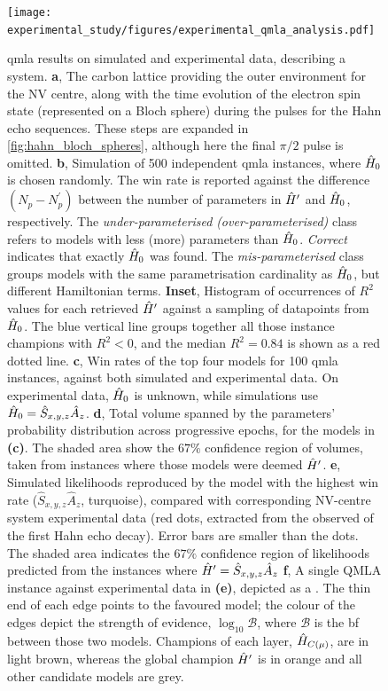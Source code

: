 \begin{figure}
    \texttt{[image: experimental\_study/figures/experimental\_qmla\_analysis.pdf]}
    \caption[\gls{qmla} applied to experimental  system]{
        \gls{qmla} results on simulated and experimental data, describing a  system. 
        \textbf{a}, 
        The carbon lattice providing the outer environment for the NV centre, along with the
        time evolution of the electron spin state (represented on a Bloch sphere) during the pulses for the Hahn echo sequences. 
        These steps are expanded in \cref{fig:hahn_bloch_spheres}, although here the final $\pi/2$ pulse is omitted.  
        \textbf{b}, 
        Simulation of 500 independent \gls{qmla} instances, where $\hat{H}_0$ is chosen randomly. 
        The  \gls{win rate}  is reported against the difference $(N_{p}-N^{\prime}_p)$ between the 
        number of parameters in $\hat{H}^{\prime}$ and $\hat{H}_0$, respectively. 
        The \emph{under-parameterised} \emph{ (over-parameterised)} class refers to models with less (more) 
        parameters than $\hat{H}_0$. 
        \emph{Correct} indicates that exactly $\hat{H}_0$ was found. 
        The \emph{mis-parameterised} class groups models with the same parametrisation cardinality as $\hat{H}_0$, but different Hamiltonian terms. 
        \textbf{Inset}, Histogram of occurrences of $R^2$ values for each retrieved $\hat{H}^{\prime}$ 
        against a sampling of datapoints from $\hat{H}_0$.
        The blue vertical line groups together all those instance champions with $R^2<0$, and the median $R^2=0.84$ is shown as a red dotted line.
        \textbf{c}, 
        Win rates of the top four models for 100 \gls{qmla} instances, against both simulated and experimental data. 
        On experimental data, $\hat{H}_0$ is unknown, while simulations use $\hat{H}_0 = \hat{S}_{x,y,z}\hat{A}_{z}$.
        \textbf{d}, 
        Total \gls{volume} spanned by the parameters' probability distribution across progressive epochs, for the models in \textbf{(c)}. 
        The shaded area show the $67\%$ confidence region of volumes, taken from instances where those models were deemed $\hat{H}^{\prime}$.
        \textbf{e}, 
        Simulated \glspl{likelihood}  reproduced by the model with the highest  \gls{win rate}  ($\hat{S}_{x,y,z}\hat{A}_{z}$, turquoise), 
            compared with corresponding NV-centre system experimental data 
            (red dots, extracted from the observed  of the first Hahn echo decay). 
        Error bars are smaller than the dots.
        The shaded area indicates the $67\%$ confidence region of likelihoods predicted from the instances where $\hat{H}^{\prime}=\hat{S}_{x,y,z}\hat{A}_{z}$
        \textbf{f}, 
        A single QMLA \gls{instance} against experimental data in \textbf{(e)}, depicted as a .
        The thin end of each edge points to the favoured model; 
        the colour of the edges depict the strength of evidence, $\log_{10}\mathcal{B}$, where $\mathcal{B}$ is the \gls{bf} between those two models.
        Champions of each layer, $\hat{H}_{C(\mu)}$, are in light brown, whereas the global champion $\hat{H}^{\prime}$
        is in orange and all other candidate models are grey.
    }
    \label{fig:exp_qmla_analysis}
\end{figure}
